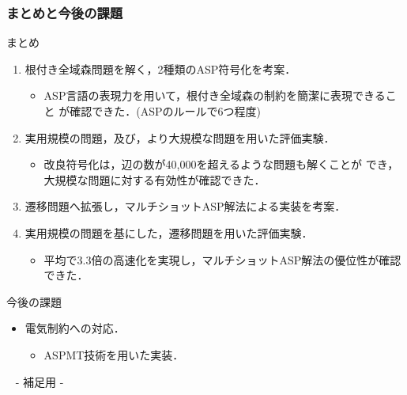 \documentclass[dvipdfmx,11pt]{beamer}
\begin{document}
\begin{frame}\frametitle{まとめと今後の課題}
 \begin{block}{まとめ}
  \begin{enumerate}
   \item 根付き全域森問題を解く，2種類のASP符号化を考案．
   \begin{itemize}
	\item ASP言語の表現力を用いて，根付き全域森の制約を簡潔に表現できること
		  が確認できた．(ASPのルールで6つ程度)
   \end{itemize}
   \item 実用規模の問題，及び，より大規模な問題を用いた評価実験．
   \begin{itemize}
	\item 改良符号化は，辺の数が40,000を超えるような問題も解くことが
		  でき，大規模な問題に対する有効性が確認できた．
   \end{itemize}
   \item 遷移問題へ拡張し，マルチショットASP解法による実装を考案．
   \item 実用規模の問題を基にした，遷移問題を用いた評価実験．
   \begin{itemize}
	\item 平均で3.3倍の高速化を実現し，マルチショットASP解法の優位性が確認できた．
   \end{itemize}
  \end{enumerate}
 \end{block}
 
 \begin{alertblock}{今後の課題}
  \begin{itemize}
   \item 電気制約への対応．
		 \begin{itemize}
		  \item ASPMT技術を用いた実装．
		 \end{itemize}
  \end{itemize}
 \end{alertblock}
\end{frame}


\begin{frame}{~}
 \centering
 - 補足用 -
\end{frame} 
\end{document}
